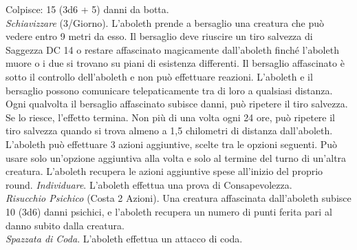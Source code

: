 \begin{multicols}{2}
Colpisce: 15 (3d6 + 5) danni da botta.\\
\textit{Schiavizzare} (3/Giorno). L’aboleth prende a bersaglio una creatura che può vedere entro 9 metri da esso. Il bersaglio deve riuscire un tiro salvezza di Saggezza DC 14 o restare affascinato magicamente dall’aboleth finché l’aboleth muore o i due si trovano su piani di esistenza differenti. Il bersaglio affascinato è sotto il controllo dell’aboleth e non può effettuare reazioni. L’aboleth e il bersaglio possono comunicare telepaticamente tra di loro a qualsiasi distanza.  Ogni qualvolta il bersaglio affascinato subisce danni, può ripetere il tiro salvezza. Se lo riesce, l’effetto termina. Non più di una volta ogni 24 ore, può ripetere il tiro salvezza quando si trova almeno a 1,5 chilometri di distanza dall’aboleth.\\
L’aboleth può effettuare 3 azioni aggiuntive, scelte tra le opzioni seguenti. Può usare solo un’opzione aggiuntiva alla volta e solo al termine del turno di un’altra creatura. L’aboleth recupera le azioni aggiuntive spese all’inizio del proprio round.
\textit{Individuare}. L’aboleth effettua una prova di Consapevolezza.\\
\textit{Risucchio Psichico} (Costa 2 Azioni). Una creatura affascinata dall’aboleth subisce 10 (3d6) danni psichici, e l’aboleth recupera un numero di punti ferita pari al danno subito dalla creatura.\\
\textit{Spazzata di Coda}. L’aboleth effettua un attacco di coda.  \\


\end{multicols}
